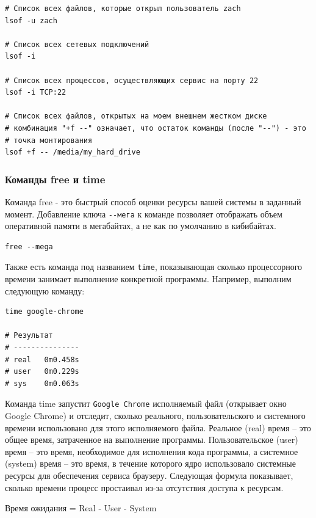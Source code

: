 \documentclass[12pt]{article}
\begin{document}
\begin{verbatim}
# Список всех файлов, которые открыл пользователь zach
lsof -u zach

# Список всех сетевых подключений
lsof -i

# Список всех процессов, осуществляющих сервис на порту 22
lsof -i TCP:22

# Список всех файлов, открытых на моем внешнем жестком диске
# комбинация "+f --" означает, что остаток команды (после "--") - это
# точка монтирования
lsof +f -- /media/my_hard_drive
\end{verbatim}

\hypertarget{free-time}{%
\subsubsection{\texorpdfstring{\protect\hyperlink{free-time}{}Команды
free и time}{Команды free и time}}\label{free-time}}

Команда free - это быстрый способ оценки ресурсы вашей системы в
заданный момент. Добавление ключа \texttt{-\/-мега} к команде позволяет
отображать объем оперативной памяти в мегабайтах, а не как по умолчанию
в кибибайтах.

\begin{verbatim}
free --mega
\end{verbatim}

Также есть команда под названием \texttt{time}, показывающая сколько
процессорного времени занимает выполнение конкретной программы.
Например, выполним следующую команду:

\begin{verbatim}
time google-chrome

# Результат
# ---------------
# real   0m0.458s
# user   0m0.229s
# sys    0m0.063s
\end{verbatim}

Команда time запустит \texttt{Google Chrome} исполняемый файл (открывает окно
Google Chrome) и отследит, сколько реального, пользовательского и
системного времени использовано для этого исполняемого файла.
Реальное (real) время -- это общее время, затраченное на выполнение
программы. Пользовательское (user) время -- это время, необходимое для
исполнения кода программы, а системное (system) время -- это время, в
течение которого ядро использовало системные ресурсы для обеспечения
сервиса браузеру. Следующая формула показывает, сколько времени процесс
простаивал из-за отсутствия доступа к ресурсам.

Время ожидания = Real - User - System
\end{document}
